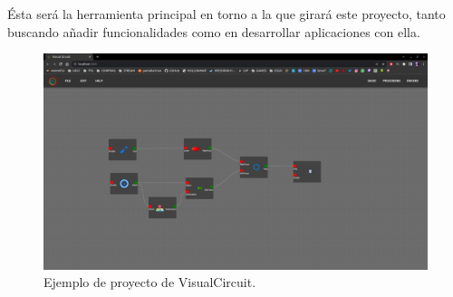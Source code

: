 \newpage
Ésta será la herramienta principal en torno a la que girará este proyecto, tanto buscando añadir funcionalidades como en desarrollar aplicaciones con ella.

\begin{figure} [H]
    \begin{center}
        \includegraphics[width=13cm]{figs/c3/VC_example.png}
    \end{center}
    \caption[Ejemplo VisualCircuit]{Ejemplo de proyecto de VisualCircuit.}
    \label{fig:ex_VC}
\end{figure}




